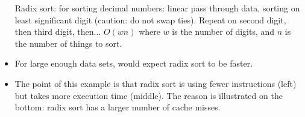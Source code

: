 \begin{frame}[fragile]
\begin{itemize}
		Radix sort: for sorting decimal numbers: linear pass through
		data, sorting on least significant digit (caution: do not
		swap ties).  Repeat on second digit, then third digit, then...  
		$O(wn)$ where $w$ is the number of digits, and $n$ is the number
		of things to sort.
    \item For large enough data sets, would expect radix sort to be faster.
	\item The point of this example is that radix sort is using fewer
		instructions (left) but takes more execution time (middle).
		The reason is illustrated on the bottom: radix sort has
		a larger number of cache misses.
\end{itemize}
\fi\ENotes
\end{frame}




